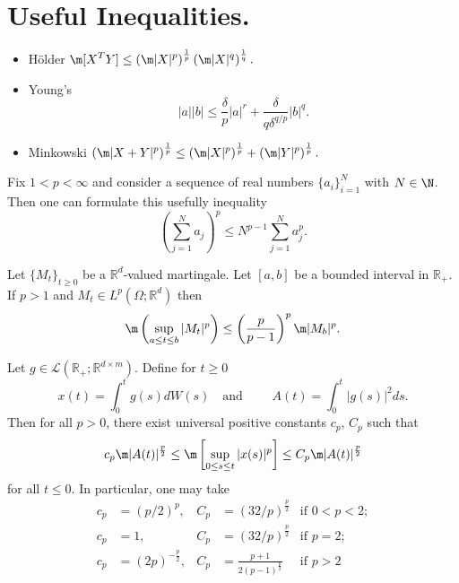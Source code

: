 \section{Useful Inequalities.}
\begin{itemize}
	\item H\"older
		$ \displaystyle
			\m[X^T Y] \leq
			\left(
				\m|X|^p
			\right)^{\frac{1}{p}}		
			\left(
				\m|X|^q
			\right)^{\frac{1}{q}}.
		 $
	\item Young's
		\begin{equation}\label{eqn:YoungsInequality}
			|a||b| 
			\leq
			\frac{\delta}{p} |a|^r
			+\frac{\delta}{q \delta^{q/p}} |b|^q.
		\end{equation}
	\item Minkowski
		$
			\displaystyle
			\left(
				\m |X+Y|^p
			\right)^{\frac{1}{p}}
			\leq
			\left(
				\m |X|^p
			\right)^{\frac{1}{p}}
			+
			\left(
				\m |Y|^p
			\right)^{\frac{1}{p}}.
		$
\end{itemize}
Fix $1<p<\infty$ and consider a sequence of real numbers $\{a_i\}_{i=1}^{N}$  with $N \in \N$. Then one can formulate 
this usefully inequality
\begin{equation}\label{eqn:SingleHolder}
	\left(
	\sum_{j=1}^N a_j
	\right)^p
	\leq
	N^{p-1}
	\sum_{j=1}^{N}
	a_j^p.
\end{equation}

\begin{thm}\label{thm:DoobMartingaleInequality}
	Let $\{M_t\}_{t\geq 0}$ be a $\mathbb{R}^d$-valued martingale. Let $[a,b]$ be a bounded interval in $
	\mathbb{R}_{+}$.
	If $p>1$ and $M_t\in L^p(\Omega;\mathbb{R}^d)$ then
	\begin{equation}
		\m\left( \sup_{a\leq t \leq b} |M_t|^p\right) 
		\leq \left(\frac{p}{p-1}\right)^p \m|M_b|^p. 
	\end{equation}

\end{thm}

\begin{thm}\label{thm:BDG}
	Let $g\in \mathcal{L}(\mathbb{R}_+; \mathbb{R}^{d\times m})$. Define for $t\geq 0$
	\begin{equation*}
		x(t) = \int_{0}^{t} g(s)dW(s) \quad \text{and } \qquad 
		A(t) = \int_{0}^{t} |g(s)|^2 ds.
	\end{equation*}
	Then for all $p>0$, there exist universal positive constants $c_p$, $C_p$ such that
	\begin{equation}
		c_p\m|{A(t)}|^{\frac{p}{2}}
		\leq
		\m \left[
		\sup_{0\leq s \leq t} |x(s)|^p
		\right]
		\leq 
		C_p \m |A(t)|^{\frac{p}{2}}
	\end{equation}
	for all $t\leq 0$.  In particular, one may take
	\begin{align*}
		c_p &= (p/2)^p, & 			 C_p &= (32/p)^{\frac{p}{2}} & \text{if } 0<p<2; \\
		c_p &= 1,       & 			 C_p &= (32/p)^{\frac{p}{2}} & \text{if } p=2; \\
		c_p &= (2p)^{-\frac{p}{2}},& C_p &= \frac{p+1}{2(p-1)^{\frac{p}{2}}} & \text{if } p>2 \\
	\end{align*}
\end{thm}

